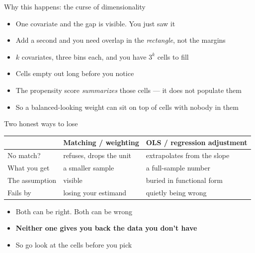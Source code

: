 \documentclass{beamer}
\newcommand{\highlight}[1]{\textcolor{accent}{\textbf{#1}}}
\begin{document}
\begin{frame}{Why this happens: the curse of dimensionality}

\begin{itemize}
\item One covariate and the gap is visible. You just saw it
\item Add a second and you need overlap in the \emph{rectangle}, not the margins
\item $k$ covariates, three bins each, and you have $3^k$ cells to fill
\end{itemize}

\vspace{0.7em}

\begin{itemize}
\item Cells empty out long before you notice
\item The propensity score \emph{summarizes} those cells --- it does not populate them
\item So a balanced-looking weight can sit on top of cells with nobody in them
\end{itemize}

\end{frame}


\begin{frame}{Two honest ways to lose}

\centering
{\small
\begin{tabular}{lll}
\toprule
 & \textbf{Matching / weighting} & \textbf{OLS / regression adjustment} \\
\midrule
No match?      & refuses, drops the unit  & extrapolates from the slope \\
What you get   & a smaller sample         & a full-sample number \\
The assumption & visible                  & buried in functional form \\
Fails by       & losing your estimand     & quietly being wrong \\
\bottomrule
\end{tabular}}

\vspace{1.1em}
\raggedright

\begin{itemize}
\item Both can be right. Both can be wrong
\item \highlight{Neither one gives you back the data you don't have}
\item So go look at the cells before you pick
\end{itemize}

\end{frame}
\end{document}
